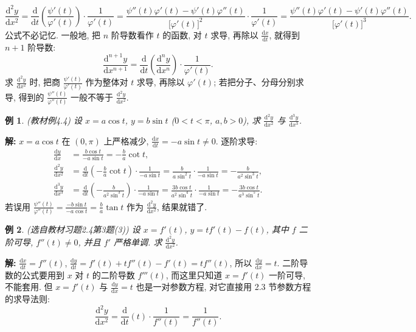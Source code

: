 \documentclass[UTF8,openany]{ctexbook}
\theoremstyle{chinesetextbook}
\newtheorem{example}{例}[section]
\newenvironment{cnsolution}{\par\indent\textbf{解:} \ignorespaces}{\par}
\newcommand{\dd}{\mathrm d}
\begin{document}
\[
\frac{\dd^2y}{\dd x^2}=\frac{\dd}{\dd t}\left(\frac{\psi'(t)}{\varphi'(t)}\right)\cdot\frac1{\varphi'(t)}=\frac{\psi''(t)\varphi'(t)-\psi'(t)\varphi''(t)}{\bigl[\varphi'(t)\bigr]^2}\cdot\frac1{\varphi'(t)}=\frac{\psi''(t)\varphi'(t)-\psi'(t)\varphi''(t)}{\bigl[\varphi'(t)\bigr]^3}.
\]
公式不必记忆. 一般地, 把 $n$ 阶导数看作 $t$ 的函数, 对 $t$ 求导, 再除以 $\displaystyle\frac{\dd x}{\dd t}$, 就得到 $n+1$ 阶导数:
\[
\frac{\dd^{n+1}y}{\dd x^{n+1}}=\frac{\dd}{\dd t}\left(\frac{\dd^ny}{\dd x^n}\right)\cdot\frac1{\varphi'(t)}.
\]
求 $\displaystyle\frac{\dd^2y}{\dd x^2}$ 时, 把商 $\displaystyle\frac{\psi'(t)}{\varphi'(t)}$ 作为整体对 $t$ 求导, 再除以 $\varphi'(t)$; 若把分子、分母分别求导, 得到的 $\displaystyle\frac{\psi''(t)}{\varphi''(t)}$ 一般不等于 $\displaystyle\frac{\dd^2y}{\dd x^2}$.
\begin{example}\label{ex:c2-4-4}
\textnormal{(教材例4.4)} 设 $x=a\cos t$, $y=b\sin t$ ($0<t<\pi$, $a,b>0$), 求 $\displaystyle\frac{\dd^2y}{\dd x^2}$ 与 $\displaystyle\frac{\dd^3y}{\dd x^3}$.
\end{example}
\begin{cnsolution}
$x=a\cos t$ 在 $(0,\pi)$ 上严格减少, $\displaystyle\frac{\dd x}{\dd t}=-a\sin t\ne0$. 逐阶求导:
\[
\begin{aligned}
\frac{\dd y}{\dd x}&=\frac{b\cos t}{-a\sin t}=-\frac ba\cot t,\\
\frac{\dd^2y}{\dd x^2}&=\frac{\dd}{\dd t}\left(-\frac ba\cot t\right)\cdot\frac1{-a\sin t}=\frac b{a\sin^2t}\cdot\frac1{-a\sin t}=-\frac b{a^2\sin^3t},\\
\frac{\dd^3y}{\dd x^3}&=\frac{\dd}{\dd t}\left(-\frac b{a^2\sin^3t}\right)\cdot\frac1{-a\sin t}=\frac{3b\cos t}{a^2\sin^4t}\cdot\frac1{-a\sin t}=-\frac{3b\cos t}{a^3\sin^5t}.
\end{aligned}
\]
若误用 $\displaystyle\frac{\psi''(t)}{\varphi''(t)}=\frac{-b\sin t}{-a\cos t}=\frac ba\tan t$ 作为 $\displaystyle\frac{\dd^2y}{\dd x^2}$, 结果就错了.
\end{cnsolution}
\begin{example}\label{ex:c2-h4-3}
\textnormal{(选自教材习题2.4第3题(3))} 设 $x=f'(t)$, $y=tf'(t)-f(t)$, 其中 $f$ 二阶可导, $f''(t)\ne0$, 并且 $f'$ 严格单调. 求 $\displaystyle\frac{\dd^2y}{\dd x^2}$.
\end{example}
\begin{cnsolution}
$\displaystyle\frac{\dd x}{\dd t}=f''(t)$, $\displaystyle\frac{\dd y}{\dd t}=f'(t)+tf''(t)-f'(t)=tf''(t)$, 所以 $\displaystyle\frac{\dd y}{\dd x}=t$. 二阶导数的公式要用到 $x$ 对 $t$ 的二阶导数 $f'''(t)$, 而这里只知道 $x=f'(t)$ 一阶可导, 不能套用. 但 $x=f'(t)$ 与 $\displaystyle\frac{\dd y}{\dd x}=t$ 也是一对参数方程, 对它直接用 2.3 节参数方程的求导法则:
\[
\frac{\dd^2y}{\dd x^2}=\frac{\dd}{\dd t}(t)\cdot\frac1{f''(t)}=\frac1{f''(t)}.
\]
\end{cnsolution}
\end{document}
